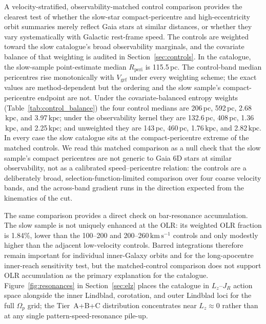 \documentclass{aa}  %
\newcommand{\vgrf}{\ensuremath{V_{\mathrm{grf}}}\xspace}
\newcommand{\kms}{\ensuremath{\,\mathrm{km\,s^{-1}}}\xspace}
\newcommand{\kpc}{\ensuremath{\,\mathrm{kpc}}\xspace}
\newcommand{\Rperi}{R_{\mathrm{peri}}}
\begin{document}
A velocity-stratified, observability-matched control comparison provides
the clearest test of whether the slow-star compact-pericentre and
high-eccentricity orbit summaries merely reflect Gaia stars at similar
distances, or whether they vary systematically with Galactic rest-frame
speed.  The
controls are weighted toward the slow catalogue's broad observability
marginals, and the covariate balance of that weighting is audited in
Section~\ref{sec:controls}.  In the catalogue, the slow-sample
point-estimate median $\Rperi$ is 115.5\,pc.  The control-band median
pericentres rise monotonically with $\vgrf$ under every weighting scheme;
the exact values are method-dependent but the ordering and the slow
sample's compact-pericentre endpoint are not.  Under the
covariate-balanced entropy weights (Table~\ref{tab:control_balance}) the
four control medians are 206\,pc, 592\,pc, 2.68\kpc, and 3.97\kpc; under
the observability kernel they are 132.6\,pc, 408\,pc, 1.36\kpc, and
2.25\kpc; and unweighted they are 143\,pc, 460\,pc, 1.76\kpc, and
2.82\kpc.  In every case the slow catalogue sits at the compact-pericentre
extreme of the matched controls.  We read this matched comparison as a null
check that the slow sample's compact pericentres are not generic to Gaia 6D
stars at similar observability, not as a calibrated speed--pericentre
relation: the controls are a deliberately broad, selection-function-limited
comparison over four coarse velocity bands, and the across-band gradient
runs in the direction expected from the kinematics of the cut.

The same comparison provides a direct check on bar-resonance
accumulation.  The slow sample is not uniquely enhanced at the OLR:
its weighted OLR fraction is 1.84\%, lower than the 100--200 and
200--260\kms{} controls and only modestly higher than the adjacent
low-velocity controls.  Barred integrations therefore remain important
for individual inner-Galaxy orbits and for the long-apocentre inner-reach sensitivity test,
but the matched-control comparison does not support OLR accumulation as
the primary explanation for the catalogue.  Figure~\ref{fig:resonances}
in Section~\ref{sec:elz} places the catalogue in $L_z$--$J_R$ action
space alongside the inner Lindblad, corotation, and outer Lindblad
loci for the full $\Omega_p$ grid; the Tier~A+B+C distribution
concentrates near $L_z\approx0$ rather than at any single
pattern-speed-resonance pile-up.
\end{document}

